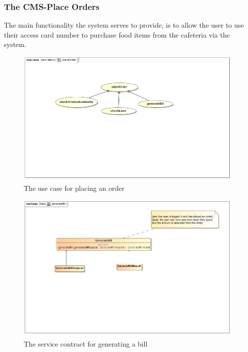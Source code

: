 \documentclass[a4paper,12pt]{article}
\begin{document}
\subsubsection{The CMS-Place Orders}
The main functionality the system serves to provide, is  to allow the user to use their access card number to purchase food items from the cafeteria via the system.
\begin{figure}[H]
  \centering
    \includegraphics[width=1.0\textwidth]{images/placeOrder.png}
    \caption{The use case for placing an order} 
\end{figure}
 
\begin{figure}[H]
	\centering
	\includegraphics[width=1.0\textwidth]{images/generateBillSC.jpg}
	\caption{The service contract for generating a bill}
\end{figure}
 
\end{document}
